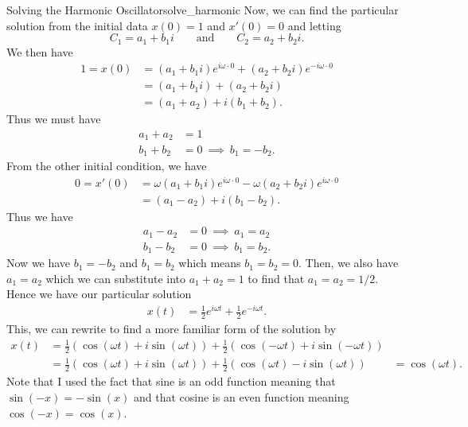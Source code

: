 \begin{ex}{Solving the Harmonic Oscillator}{solve_harmonic}
        Now, we can find the particular solution from the initial data $x(0)=1$ and $x'(0)=0$ and letting
        \[
        C_1=a_1+b_1i \qquad \textrm{and} \qquad C_2=a_2+b_2i.
        \]
        We then have
        \begin{align*}
                    1=x(0)&=(a_1+b_1i)e^{i\omega \cdot 0}+(a_2+b_2 i)e^{-i\omega \cdot 0}\\
                    &=(a_1+b_1i)+(a_2+b_2i)\\
                    &=(a_1+a_2)+i(b_1+b_2).
        \end{align*}
        Thus we must have 
        \begin{align*}
            a_1+a_2&=1\\
            b_1+b_2&=0 ~\implies~ b_1=-b_2.
        \end{align*}
        From the other initial condition, we have
        \begin{align*}
        0=x'(0)&=\omega(a_1+b_1i)e^{i\omega \cdot 0}-\omega (a_2+b_2i)e^{i\omega \cdot 0}\\
        &=(a_1-a_2)+i(b_1-b_2).
        \end{align*}
        Thus we have
        \begin{align*}
            a_1-a_2&=0 ~\implies~ a_1=a_2\\
            b_1-b_2&=0 ~\implies~ b_1=b_2.
        \end{align*}
        Now we have $b_1=-b_2$ and $b_1=b_2$ which means $b_1=b_2=0$.  Then, we also have $a_1=a_2$ which we can substitute into $a_1+a_2=1$ to find that $a_1=a_2=1/2$.  Hence we have our particular solution
        \begin{align*}
            x(t)&=\frac{1}{2}e^{i\omega t}+\frac{1}{2}e^{-i\omega t}.
            \end{align*}
            This, we can rewrite to find a more familiar form of the solution by
            \begin{align*}
            x(t)&= \frac{1}{2}(\cos(\omega t)+i\sin(\omega t)) + \frac{1}{2}(\cos(-\omega t)+i\sin(-\omega t))\\
            &= \frac{1}{2}(\cos(\omega t)+i\sin(\omega t))+\frac{1}{2}(\cos(\omega t)-i\sin(\omega t))
            &=\cos(\omega t).
        \end{align*}
        Note that I used the fact that sine is an odd function meaning that $\sin(-x)=-\sin(x)$ and that cosine is an even function meaning $\cos(-x)=\cos(x)$.  
        \end{ex}
        
